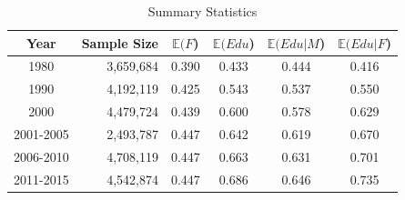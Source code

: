 \documentclass[beamer, t]{beamer}
\begin{document}
\begin{frame}
	
	\begin{table}[ht]
		\caption{Summary Statistics} \label{tb:summary_stat}
		\centering
		\footnotesize
		\begin{tabular}{crcccc}
			\hline
			Year & Sample Size & $\mathbb E(F$) & $\mathbb E(Edu$) & $\mathbb E(Edu|M$) & $\mathbb E(Edu|F$) \\ 
			\hline
			1980      & 3,659,684 & 0.390 & 0.433 & 0.444 & 0.416 \\ 
			1990      & 4,192,119 & 0.425 & 0.543 & 0.537 & 0.550 \\ 
			2000      & 4,479,724 & 0.439 & 0.600 & 0.578 & 0.629 \\ 
			2001-2005 & 2,493,787 & 0.447 & 0.642 & 0.619 & 0.670 \\ 
			2006-2010 & 4,708,119 & 0.447 & 0.663 & 0.631 & 0.701 \\ 
			2011-2015 & 4,542,874 & 0.447 & 0.686 & 0.646 & 0.735 \\ 
			\hline
		\end{tabular}
	\end{table}
	
	
\end{frame}
\end{document}
